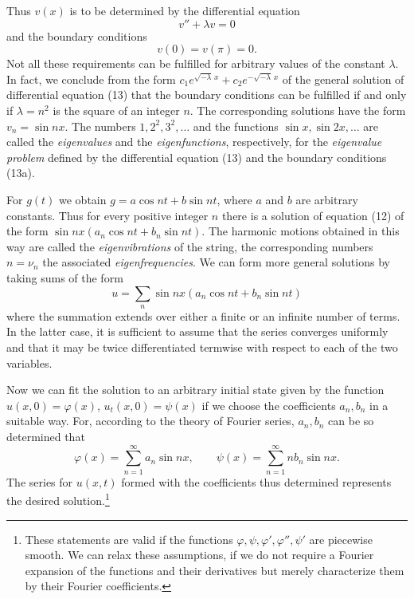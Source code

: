 Thus $v(x)$ is to be determined by the differential equation
\begin{equation}\tag{13}
v''+\lambda v=0
\end{equation}
and the boundary conditions
\begin{equation}\tag{13a}
v(0)=v(\pi)=0.
\end{equation}
Not all these requirements can be fulfilled for arbitrary values of the constant $\lambda$. In fact, we conclude from the form $c_1e^{\sqrt{-\lambda}\,x}+c_2e^{-\sqrt{-\lambda}\,x}$ of the general solution of differential equation (13) that the boundary conditions can be fulfilled if and only if $\lambda=n^2$ is the square of an integer $n$. The corresponding solutions have the form $v_n=\sin nx$. The numbers $1,2^2,3^2,\ldots$ and the functions $\sin x,\sin2x,\ldots$ are called the \emph{eigenvalues} and the \emph{eigenfunctions}, respectively, for the \emph{eigenvalue problem} defined by the differential equation (13) and the boundary conditions (13a).

For $g(t)$ we obtain $g=a\cos nt+b\sin nt$, where $a$ and $b$ are arbitrary constants. Thus for every positive integer $n$ there is a solution of equation (12) of the form $\sin nx(a_n\cos nt+b_n\sin nt)$. The harmonic motions obtained in this way are called the \emph{eigenvibrations} of the string, the corresponding numbers $n=\nu_n$ the associated \emph{eigenfrequencies}. We can form more general solutions by taking sums of the form
\[
u=\sum_n\sin nx(a_n\cos nt+b_n\sin nt)
\]
where the summation extends over either a finite or an infinite number of terms. In the latter case, it is sufficient to assume that the series converges uniformly and that it may be twice differentiated termwise with respect to each of the two variables.

Now we can fit the solution to an arbitrary initial state given by the function $u(x,0)=\varphi(x)$, $u_t(x,0)=\psi(x)$ if we choose the coefficients $a_n,b_n$ in a suitable way. For, according to the theory of Fourier series, $a_n,b_n$ can be so determined that
\[
\varphi(x)=\sum_{n=1}^{\infty}a_n\sin nx,
\qquad
\psi(x)=\sum_{n=1}^{\infty}nb_n\sin nx.
\]
The series for $u(x,t)$ formed with the coefficients thus determined represents the desired solution.\footnote{These statements are valid if the functions $\varphi,\psi,\varphi',\varphi'',\psi'$ are piecewise smooth. We can relax these assumptions, if we do not require a Fourier expansion of the functions and their derivatives but merely characterize them by their Fourier coefficients.}


